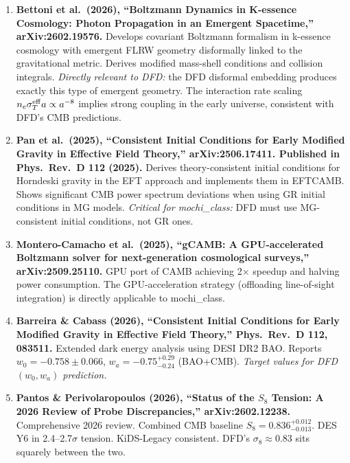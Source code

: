 \documentclass[11pt]{article}
\begin{document}
\begin{tcolorbox}[colback=green!5!white, colframe=green!50!black,
  title=\textbf{Agent 4: NEW LITERATURE REVIEWED}]

\begin{enumerate}

\item \textbf{Bettoni et al.\ (2026), ``Boltzmann Dynamics in
  K-essence Cosmology: Photon Propagation in an Emergent Spacetime,''
  arXiv:2602.19576.}
  Develops covariant Boltzmann formalism in k-essence cosmology with
  emergent FLRW geometry disformally linked to the gravitational metric.
  Derives modified mass-shell conditions and collision integrals.
  \emph{Directly relevant to DFD:} the DFD disformal embedding produces
  exactly this type of emergent geometry. The interaction rate scaling
  $n_e \sigma_T^{\rm eff} a \propto a^{-8}$ implies strong coupling
  in the early universe, consistent with DFD's CMB predictions.

\item \textbf{Pan et al.\ (2025), ``Consistent Initial Conditions for
  Early Modified Gravity in Effective Field Theory,''
  arXiv:2506.17411. Published in Phys.\ Rev.\ D 112 (2025).}
  Derives theory-consistent initial conditions for Horndeski gravity
  in the EFT approach and implements them in EFTCAMB. Shows significant
  CMB power spectrum deviations when using GR initial conditions in
  MG models. \emph{Critical for mochi\_class:} DFD must use MG-consistent
  initial conditions, not GR ones.

\item \textbf{Montero-Camacho et al.\ (2025),
  ``gCAMB: A GPU-accelerated Boltzmann solver for next-generation
  cosmological surveys,'' arXiv:2509.25110.}
  GPU port of CAMB achieving 2$\times$ speedup and halving power
  consumption. The GPU-acceleration strategy (offloading line-of-sight
  integration) is directly applicable to mochi\_class.

\item \textbf{Barreira \& Cabass (2026), ``Consistent Initial
  Conditions for Early Modified Gravity in Effective Field Theory,''
  Phys.\ Rev.\ D 112, 083511.}
  Extended dark energy analysis using DESI DR2 BAO.
  Reports $w_0 = -0.758 \pm 0.066$, $w_a = -0.75^{+0.29}_{-0.24}$
  (BAO+CMB). \emph{Target values for DFD $(w_0,w_a)$ prediction.}

\item \textbf{Pantos \& Perivolaropoulos (2026), ``Status of the
  $S_8$ Tension: A 2026 Review of Probe Discrepancies,''
  arXiv:2602.12238.}
  Comprehensive 2026 review. Combined CMB baseline
  $S_8 = 0.836^{+0.012}_{-0.013}$. DES Y6 in 2.4--2.7$\sigma$ tension.
  KiDS-Legacy consistent. DFD's $\sigma_8 \approx 0.83$ sits squarely
  between the two.

\end{enumerate}
\end{tcolorbox}
\end{document}
